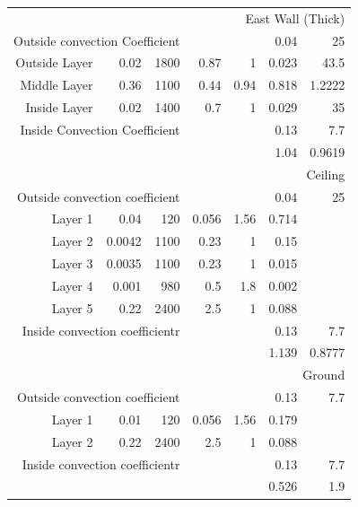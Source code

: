 \documentclass[11pt, a4paper]{article}
\theoremstyle{definition}
\begin{document}
\begin{table}[h!]
\begin{tabular}{rrrrrrr}
			    \midrule
			    \multicolumn{7}{p{26.86em}}{East Wall (Thick)} \\
			    \multicolumn{3}{p{13.93em}}{Outside convection Coefficient} &      &      & 0.04 & 25 \\
			    \multicolumn{1}{p{6.785em}}{Outside Layer} & 0.02 & 1800 & 0.87 & 1    & 0.023 & 43.5 \\
			    \multicolumn{1}{p{6.785em}}{Middle Layer} & 0.36 & 1100 & 0.44 & 0.94 & 0.818 & 1.2222 \\
			    \multicolumn{1}{p{6.785em}}{Inside Layer} & 0.02 & 1400 & 0.7  & 1    & 0.029 & 35 \\
			    \multicolumn{3}{p{13.93em}}{Inside Convection Coefficient} &      &      & 0.13 & 7.7 \\
			         &      &      &      &      & 1.04 & 0.9619 \\
			    \midrule
			    \multicolumn{7}{p{26.86em}}{Ceiling} \\
			    \multicolumn{3}{p{13.93em}}{Outside convection coefficient} &      &      & 0.04 & 25 \\
			    \multicolumn{1}{p{6.785em}}{Layer 1} & 0.04 & 120  & 0.056 & 1.56 & 0.714 &  \\
			    \multicolumn{1}{p{6.785em}}{Layer 2} & 0.0042 & 1100 & 0.23 & 1    & 0.15 &  \\
			    \multicolumn{1}{p{6.785em}}{Layer 3} & 0.0035 & 1100 & 0.23 & 1    & 0.015 &  \\
			    \multicolumn{1}{p{6.785em}}{Layer 4} & 0.001 & 980  & 0.5  & 1.8  & 0.002 &  \\
			    \multicolumn{1}{p{6.785em}}{Layer 5} & 0.22 & 2400 & 2.5  & 1    & 0.088 &  \\
			    \multicolumn{3}{p{13.93em}}{Inside convection coefficientr} &      &      & 0.13 & 7.7 \\
			         &      &      &      &      & 1.139 & 0.8777 \\
			    \midrule
			    \multicolumn{7}{p{26.86em}}{Ground} \\
			    \multicolumn{3}{p{13.93em}}{Outside convection coefficient} &      &      & 0.13 & 7.7 \\
			    \multicolumn{1}{p{6.785em}}{Layer 1} & 0.01 & 120  & 0.056 & 1.56 & 0.179 &  \\
			    \multicolumn{1}{p{6.785em}}{Layer 2} & 0.22 & 2400 & 2.5  & 1    & 0.088 &  \\
			    \multicolumn{3}{p{13.93em}}{Inside convection coefficientr} &      &      & 0.13 & 7.7 \\
			         &      &      &      &      & 0.526 & 1.9 \\
			    \bottomrule
			    \end{tabular}%
			  \label{tab:SumatraWallMaterial}%
			\end{table}%
\end{document}
